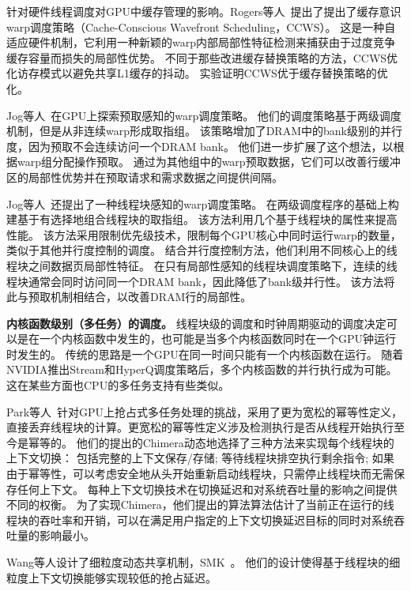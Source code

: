 针对硬件线程调度对GPU中缓存管理的影响。Rogers等人~提出了提出了缓存意识warp调度策略（Cache-Conscious Wavefront Scheduling，CCWS）。
这是一种自适应硬件机制，它利用一种新颖的warp内部局部性特征检测来捕获由于过度竞争缓存容量而损失的局部性优势。
不同于那些改进缓存替换策略的方法，CCWS优化访存模式以避免共享L1缓存的抖动。
实验证明CCWS优于缓存替换策略的优化。

Jog等人~在GPU上探索预取感知的warp调度策略。
他们的调度策略基于两级调度机制，但是从非连续warp形成取指组。 
该策略增加了DRAM中的bank级别的并行度，因为预取不会连续访问一个DRAM bank。 
他们进一步扩展了这个想法，以根据warp组分配操作预取。 
通过为其他组中的warp预取数据，它们可以改善行缓冲区的局部性优势并在预取请求和需求数据之间提供间隔。

Jog等人~还提出了一种线程块感知的warp调度策略。
在两级调度程序的基础上构建基于有选择地组合线程块的取指组。
该方法利用几个基于线程块的属性来提高性能。 
该方法采用限制优先级技术，限制每个GPU核心中同时运行warp的数量，类似于其他并行度控制的调度。 
结合并行度控制方法，他们利用不同核心上的线程块之间数据页局部性特征。 
在只有局部性感知的线程块调度策略下，连续的线程块通常会同时访问同一个DRAM bank，因此降低了bank级并行性。 
该方法将此与预取机制相结合，以改善DRAM行的局部性。

\textbf{内核函数级别（多任务）的调度。}
线程块级的调度和时钟周期驱动的调度决定可以是在一个内核函数中发生的，也可能是当多个内核函数同时在一个GPU钟运行时发生的。
传统的思路是一个GPU在同一时间只能有一个内核函数在运行。
随着NVIDIA推出Stream和HyperQ调度策略后，多个内核函数的并行执行成为可能。
这在某些方面也CPU的多任务支持有些类似。

Park等人~针对GPU上抢占式多任务处理的挑战，采用了更为宽松的幂等性定义，直接丢弃线程块的计算。更宽松的幂等性定义涉及检测执行是否从线程开始执行至今是幂等的。
他们的提出的Chimera动态地选择了三种方法来实现每个线程块的上下文切换：
包括完整的上下文保存/存储;
等待线程块排空执行剩余指令;
如果由于幂等性，可以考虑安全地从头开始重新启动线程块，只需停止线程块而无需保存任何上下文。
每种上下文切换技术在切换延迟和对系统吞吐量的影响之间提供不同的权衡。
为了实现Chimera，他们提出的算法算法估计了当前正在运行的线程块的吞吐率和开销，可以在满足用户指定的上下文切换延迟目标的同时对系统吞吐量的影响最小。


Wang等人设计了细粒度动态共享机制，SMK~。
他们的设计使得基于线程块的细粒度上下文切换能够实现较低的抢占延迟。

